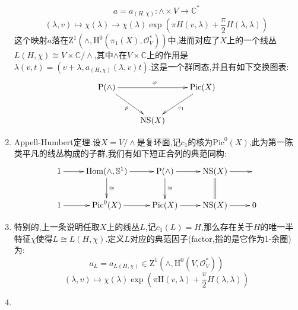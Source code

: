 \begin{enumerate}
    $$a=a_{(H,\chi)}:\wedge\times V\to\mathbb{C}^*$$
    $$(\lambda,v)\mapsto\chi(\lambda)\to\chi(\lambda)\exp(\pi H(v,\lambda)+\frac{\pi}{2}H(\lambda,\lambda))$$
    这个映射$a$落在$\mathrm{Z}^1(\wedge,\mathrm{H}^0(\pi_1(X),\mathscr{O}_V^*))$中,进而对应了$X$上的一个线丛$L(H,\chi)\cong V\times\mathbb{C}/\wedge$,其中$\wedge$在$V\times\mathbb{C}$上的作用是$\lambda(v,t)=(v+\lambda,a_{(H,\chi)}(\lambda,v)t)$.这是一个群同态,并且有如下交换图表:
    $$\xymatrix{\mathrm{P}(\wedge)\ar[rr]^{\varphi}\ar[dr]_p&&\mathrm{Pic}(X)\ar[dl]^{c_1}\\&\mathrm{NS}(X)&}$$
    \item Appell-Humbert定理.设$X=V/\wedge$是复环面,记$c_1$的核为$\mathrm{Pic}^0(X)$,此为第一陈类平凡的线丛构成的子群,我们有如下短正合列的典范同构:
    $$\xymatrix{1\ar[r]&\mathrm{Hom}(\wedge,\mathbb{S}^1)\ar[r]\ar[d]^{\cong}&\mathrm{P}(\wedge)\ar[d]^{\cong}\ar[r]&\mathrm{NS}(X)\ar[r]\ar@{=}[d]&\\1\ar[r]&\mathrm{Pic}^0(X)\ar[r]&\mathrm{Pic}(X)\ar[r]&\mathrm{NS}(X)\ar[r]&0}$$
    \item 特别的,上一条说明任取$X$上的线丛$L$,记$c_1(L)=H$,那么存在关于$H$的唯一半特征$\chi$使得$L\cong L(H,\chi)$.定义$L$对应的典范因子(factor,指的是它作为1-余圈)为:
    $$a_L=a_{L(H,\chi)}\in\mathrm{Z}^1(\wedge,\mathrm{H}^0(V,\mathscr{O}_V^*))$$
    $$(\lambda,v)\mapsto\chi(\lambda)\exp(\pi\mathrm{H}(v,\lambda)+\frac{\pi}{2}H(\lambda,\lambda))$$
    \item 
    
\end{enumerate}











